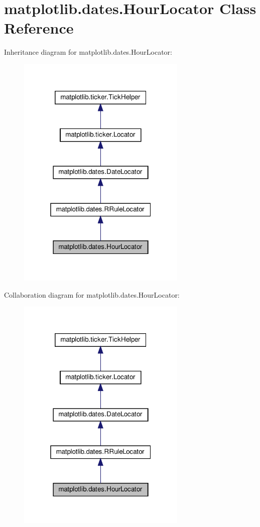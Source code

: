 \hypertarget{classmatplotlib_1_1dates_1_1HourLocator}{}\section{matplotlib.\+dates.\+Hour\+Locator Class Reference}
\label{classmatplotlib_1_1dates_1_1HourLocator}


Inheritance diagram for matplotlib.\+dates.\+Hour\+Locator\+:
\nopagebreak
\begin{figure}[H]
\begin{center}
\leavevmode
\includegraphics[width=229pt]{classmatplotlib_1_1dates_1_1HourLocator__inherit__graph}
\end{center}
\end{figure}


Collaboration diagram for matplotlib.\+dates.\+Hour\+Locator\+:
\nopagebreak
\begin{figure}[H]
\begin{center}
\leavevmode
\includegraphics[width=229pt]{classmatplotlib_1_1dates_1_1HourLocator__coll__graph}
\end{center}
\end{figure}
